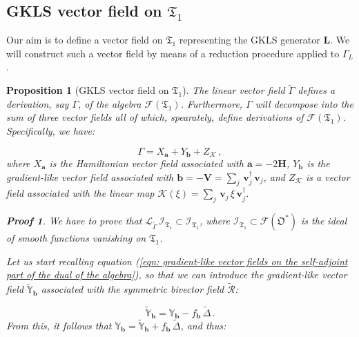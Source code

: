 \documentclass[11pt]{article}
\newcommand{\be}{\begin{equation}}
\newcommand{\ee}{\end{equation}}
\newcommand{\obsp}{\mathfrak{O}}
\newtheorem{prop}{Proposition}
\newtheorem*{pf}{Proof}
\begin{document}
\subsection{GKLS vector field on $\mathfrak{T}_{1}$}

Our aim is to define a vector field on $\mathfrak{T}_{1}$ representing the GKLS generator $\mathbf{L}$.
We will construct such a vector field by means of a reduction procedure applied to $\Gamma_{L}$.


\begin{prop}[GKLS vector field on $\mathfrak{T}_{1}$]
The linear vector field $\widetilde{\Gamma}$ defines a derivation, say $\Gamma$, of the algebra $\mathcal{F}(\mathfrak{T}_{1})$.
Furthermore, $\Gamma$ will decompose into the sum of three vector fields all of which, spearately, define derivations of $\mathcal{F}(\mathfrak{T}_{1})$.
Specifically, we have:

\be\label{eqn: GKLS vector field}
\Gamma = X_{\mathbf{a}} + Y_{\mathbf{b}} + Z_{\mathcal{K}}\,,
\ee
where $X_{\mathbf{a}}$ is the Hamiltonian vector field associated with $\mathbf{a}=-2\mathbf{H}$, $Y_{\mathbf{b}}$ is the gradient-like vector field associated with $\mathbf{b}=-\mathbf{V}=\sum_{j}\,\mathbf{v}_{j}^{\dagger}\,\mathbf{v}_{j}$, and $Z_{\mathcal{K}}$ is a vector field associated with the linear map $\mathcal{K}(\xi)=\sum_{j}\,\mathbf{v}_{j}\,\xi\,\mathbf{v}_{j}^{\dagger}$.

\begin{pf}
We have to prove that $\mathcal{L}_{\widetilde{\Gamma}}\,\mathcal{I}_{\mathfrak{T}_{1}}\subset \mathcal{I}_{\mathfrak{T}_{1}}$, where $\mathcal{I}_{\mathfrak{T}_{1}}\subset\mathcal{F}(\obsp^{*})$ is the ideal of smooth functions vanishing on $\mathfrak{T}_{1}$.

Let us  start recalling equation (\ref{eqn: gradient-like vector fields on the self-adjoint part of the dual of the algebra}), so that we can introduce the gradient-like vector field $\widetilde{\mathbb{Y}}_{\mathbf{b}}$ associated with the symmetric bivector field $\widetilde{\mathcal{R}}$:

\be
\widetilde{\mathbb{Y}}_{\mathbf{b}}=\mathbb{Y}_{\mathbf{b}} -  f_{\mathbf{b}} \,\widetilde{\Delta}\,.
\ee
From this, it follows that $\mathbb{Y}_{\mathbf{b}}= \widetilde{\mathbb{Y}}_{\mathbf{b}} + f_{\mathbf{b}}\,\widetilde{\Delta}$, and thus:


\end{pf}
\end{prop}
\end{document}
